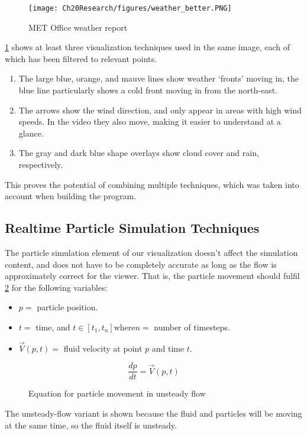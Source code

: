 \begin{figure}
    \centering
    \texttt{[image: Ch20Research/figures/weather\_better.PNG]}
    \caption{MET Office weather report\cite{video:MetOfficeTenDayTrend}}
    \label{fig:MetOffice}
\end{figure}

\cref{fig:MetOffice} shows at least three visualization techniques used in the same image, each of which has been filtered to relevant points.
\pagebreak
\begin{enumerate}
    \item The large blue, orange, and mauve lines show weather `fronts' moving in, the blue line particularly shows a cold front moving in from the north-east.
    \item The arrows show the wind direction, and only appear in areas with high wind speeds. In the video they also move, making it easier to understand at a glance.
    \item The gray and dark blue shape overlays show cloud cover and rain, respectively.
\end{enumerate}
This proves the potential of combining multiple techniques, which was taken into account when building the program.

\subsection{Realtime Particle Simulation Techniques}\label{sec:Research:Viz:Particles}
The particle simulation element of our visualization doesn't affect the simulation content, and does not have to be completely accurate as long as the flow is approximately correct for the viewer.
That is, the particle movement should fulfil \cref{eq:UnsteadyFlow}\cite{Lane93}
for the following variables:
\begin{itemize}
    \item $p = $ particle position.
    \item $t = $ time, and $t \in [t_1, t_n] \text{where} n = $ number of timesteps.
    \item $\vec{V}(p, t) = $ fluid velocity at point $p$ and time $t$.
\end{itemize}

\begin{figure}[h]
\centering
\[ \frac{dp}{dt} = \vec{V}(p, t) \]

    \caption{Equation for particle movement in unsteady flow}
    \label{eq:UnsteadyFlow}
\end{figure}
The unsteady-flow variant is shown because the fluid and particles will be moving at the same time, so the fluid itself is unsteady.


